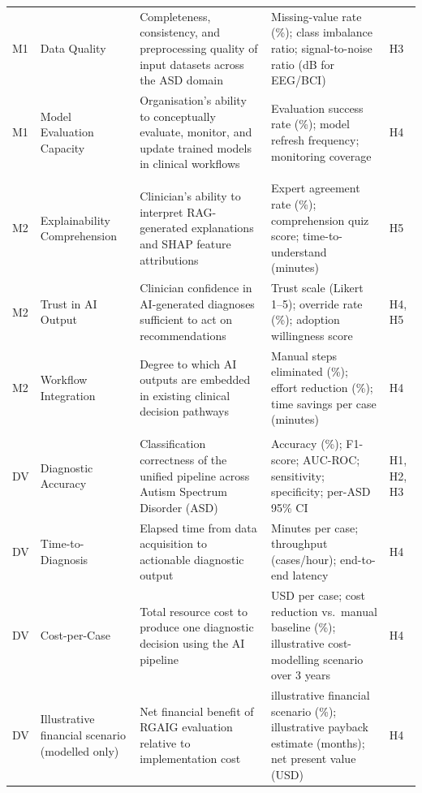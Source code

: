 {\begin{xltabular}{\textwidth}{@{} >{\raggedright\arraybackslash}p{1.5cm} >{\raggedright\arraybackslash}p{2cm} L L >{\raggedright\arraybackslash}p{1.2cm} @{}}
\addlinespace
M1 & Data Quality & Completeness, consistency, and preprocessing quality of input datasets across the ASD domain & Missing-value rate (\%); class imbalance ratio; signal-to-noise ratio (dB for EEG/BCI) & H3 \\
\addlinespace
M1 & Model Evaluation Capacity & Organisation's ability to conceptually evaluate, monitor, and update trained models in clinical workflows & Evaluation success rate (\%); model refresh frequency; monitoring coverage & H4 \\
\midrule
{} \\
\addlinespace
M2 & Explainability Comprehension & Clinician's ability to interpret RAG-generated explanations and SHAP feature attributions & Expert agreement rate (\%); comprehension quiz score; time-to-understand (minutes) & H5 \\
\addlinespace
M2 & Trust in AI Output & Clinician confidence in AI-generated diagnoses sufficient to act on recommendations & Trust scale (Likert 1--5); override rate (\%); adoption willingness score & H4, H5 \\
\addlinespace
M2 & Workflow Integration & Degree to which AI outputs are embedded in existing clinical decision pathways & Manual steps eliminated (\%); effort reduction (\%); time savings per case (minutes) & H4 \\
\midrule
{} \\
\addlinespace
DV & Diagnostic Accuracy & Classification correctness of the unified pipeline across Autism Spectrum Disorder (ASD) & Accuracy (\%); F1-score; AUC-ROC; sensitivity; specificity; per-ASD 95\% CI & H1, H2, H3 \\
\addlinespace
DV & Time-to-Diagnosis & Elapsed time from data acquisition to actionable diagnostic output & Minutes per case; throughput (cases/hour); end-to-end latency & H4 \\
\addlinespace
DV & Cost-per-Case & Total resource cost to produce one diagnostic decision using the AI pipeline & USD per case; cost reduction vs.\ manual baseline (\%); illustrative cost-modelling scenario over 3 years & H4 \\
\addlinespace
DV & Illustrative financial scenario (modelled only) & Net financial benefit of RGAIG evaluation relative to implementation cost & illustrative financial scenario (\%); illustrative payback estimate (months); net present value (USD) & H4 \\

\end{xltabular}}
